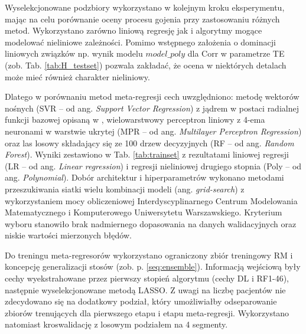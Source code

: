 Wyselekcjonowane podzbiory wykorzystano w kolejnym kroku eksperymentu, mając na celu porównanie oceny procesu gojenia przy zastosowaniu różnych metod. Wykorzystano zarówno liniową regresję jak i algorytmy mogące modelować nieliniowe zależności. Pomimo wstępnego założenia o dominacji liniowych związków np. wynik modelu $model\_poly$ dla Corr w parametrze TE (zob. Tab. \ref{tab:H_testset}) pozwala zakładać, że ocena w niektórych detalach może mieć również charakter nieliniowy. 

Dlatego w porównaniu metod meta-regresji cech uwzględniono: metodę wektorów nośnych (SVR -- od ang. \textit{Support Vector Regression}) z jądrem w postaci radialnej funkcji bazowej opisaną w \cite{SVR_drucker}, wielowarstwowy perceptron liniowy z 4-ema neuronami w warstwie ukrytej (MPR -- od ang. \textit{Multilayer Perceptron Regression}) oraz las losowy składający się ze 100 drzew decyzyjnych (RF -- od ang. \textit{Random Forest}). Wyniki zestawiono w Tab. \ref{tab:trainset} z rezultatami liniowej regresji (LR -- od ang. \textit{Linear regression}) i regresji nieliniowej drugiego stopnia (Poly -- od ang. \textit{Polynomial}). Dobór architektur i hiperparametrów wykonano metodami przeszukiwania siatki wielu kombinacji modeli (ang. \textit{grid-search}) z wykorzystaniem mocy obliczeniowej Interdyscyplinarnego Centrum Modelowania Matematycznego i Komputerowego Uniwersytetu Warszawskiego. Kryterium wyboru stanowiło brak nadmiernego dopasowania na danych walidacyjnych oraz niskie wartości mierzonych błędów.

Do treningu meta-regresorów wykorzystano ograniczony zbiór treningowy RM i koncepcję generalizacji stosów (zob. p. \ref{seq:ensemble}). Informacją wejściową były cechy wyekstrahowane przez pierwszy stopień algorytmu (cechy DL i RF1-46), następnie wyselekcjonowane metodą LASSO. Z uwagi na liczbę pacjentów nie zdecydowano się na dodatkowy podział, który umożliwiałby odseparowanie zbiorów trenujących dla pierwszego etapu i etapu meta-regresji. Wykorzystano natomiast kroswalidację z losowym podziałem na 4 segmenty.  

